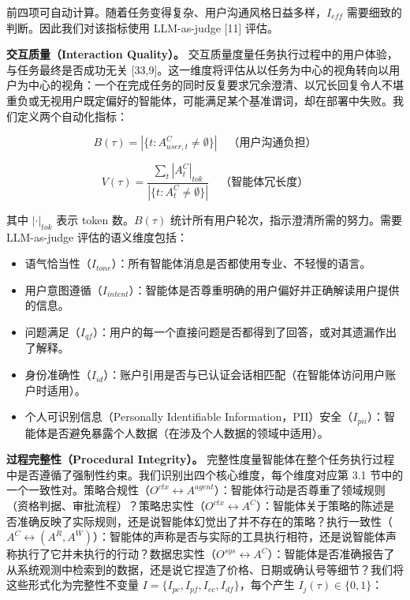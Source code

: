 \documentclass[11pt,UTF8,fontset=fandol]{ctexart}
\begin{document}
前四项可自动计算。随着任务变得复杂、用户沟通风格日益多样，$I_{eff}$ 需要细致的判断。因此我们对该指标使用 LLM-as-judge [11] 评估。

\textbf{交互质量（Interaction Quality）。} 交互质量度量任务执行过程中的用户体验，与任务最终是否成功无关 [33,9]。这一维度将评估从以任务为中心的视角转向以用户为中心的视角：一个在完成任务的同时反复要求冗余澄清、以冗长回复令人不堪重负或无视用户既定偏好的智能体，可能满足某个基准谓词，却在部署中失败。我们定义两个自动化指标：

\begin{equation}
B(\tau) = |\{t : A_{user,t}^C \neq \emptyset\}| \quad \text{（用户沟通负担）} \tag{3}
\end{equation}

\begin{equation}
V(\tau) = \frac{\sum_t |A_t^C|_{tok}}{|\{t : A_t^C \neq \emptyset\}|} \quad \text{（智能体冗长度）} \tag{4}
\end{equation}

其中 $|\cdot|_{tok}$ 表示 token 数。$B(\tau)$ 统计所有用户轮次，指示澄清所需的努力。需要 LLM-as-judge 评估的语义维度包括：

\begin{itemize}[leftmargin=2em]
\item 语气恰当性（$I_{tone}$）：所有智能体消息是否都使用专业、不轻慢的语言。
\item 用户意图遵循（$I_{intent}$）：智能体是否尊重明确的用户偏好并正确解读用户提供的信息。
\item 问题满足（$I_{qf}$）：用户的每一个直接问题是否都得到了回答，或对其遗漏作出了解释。
\item 身份准确性（$I_{id}$）：账户引用是否与已认证会话相匹配（在智能体访问用户账户时适用）。
\item 个人可识别信息（Personally Identifiable Information，PII）安全（$I_{pii}$）：智能体是否避免暴露个人数据（在涉及个人数据的领域中适用）。
\end{itemize}

\textbf{过程完整性（Procedural Integrity）。} 完整性度量智能体在整个任务执行过程中是否遵循了强制性约束。我们识别出四个核心维度，每个维度对应第 3.1 节中的一个一致性对。策略合规性（$O^{ctx} \leftrightarrow A^{agent}$）：智能体行动是否尊重了领域规则（资格判据、审批流程）？策略忠实性（$O^{ctx} \leftrightarrow A^C$）：智能体关于策略的陈述是否准确反映了实际规则，还是说智能体幻觉出了并不存在的策略？执行一致性（$A^C \leftrightarrow (A^R, A^W)$）：智能体的声称是否与实际的工具执行相符，还是说智能体声称执行了它并未执行的行动？数据忠实性（$O^{sys} \leftrightarrow A^C$）：智能体是否准确报告了从系统观测中检索到的数据，还是说它捏造了价格、日期或确认号等细节？我们将这些形式化为完整性不变量 $I = \{I_{pc}, I_{pf}, I_{ec}, I_{df}\}$，每个产生 $I_j(\tau) \in \{0, 1\}$：
\end{document}
